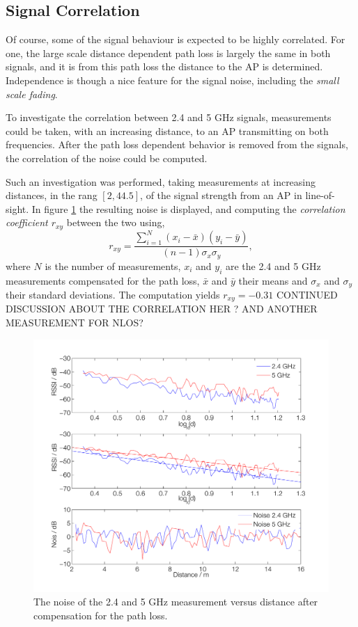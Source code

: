 \documentclass{LTHthesis}
\begin{document}
\subsection{Signal Correlation}
%
Of course, some of the signal behaviour is expected to be highly correlated. For one, the large scale distance dependent path loss is largely the same in both signals, and it is from this path loss the distance to the AP is determined. Independence is though a nice feature for the signal noise, including the \emph{small scale fading}. 

To investigate the correlation between 2.4 and 5 GHz signals, measurements could be taken, with an increasing distance, to an AP transmitting on both frequencies. After the path loss dependent behavior is removed from the signals, the correlation of the noise could be computed.  

Such an investigation was performed, taking measurements at increasing distances, in the rang $[2,44.5]$, of the signal strength from an AP in line-of-sight. In figure \ref{noise_corr_los} the resulting noise is displayed, and computing the \emph{correlation coefficient $r_{xy}$} between the two using,
\begin{equation}
r_{xy}=\frac{\sum\limits_{i=1}^{N}{(x_i-\bar{x})(y_i-\bar{y})}}{(n-1)\sigma_x\sigma_y},
\end{equation}
where $N$ is the number of measurements, $x_i$ and $y_i$ are the 2.4 and 5 GHz measurements compensated for the path loss, $\bar x$ and $\bar y$ their means and $\sigma_x$ and $\sigma_y$ their standard deviations. The computation yields $r_{xy}=-0.31$ CONTINUED DISCUSSION ABOUT THE CORRELATION HER ? AND ANOTHER MEASUREMENT FOR NLOS? 
%
\begin{figure}[!hbt]

\includegraphics[width=1\textwidth ]{images/wifi/noise_corr_los}
\caption{The noise of the 2.4 and 5 GHz measurement versus distance after compensation for the path loss.}\label{noise_corr_los}
\end{figure}
%
\end{document}
